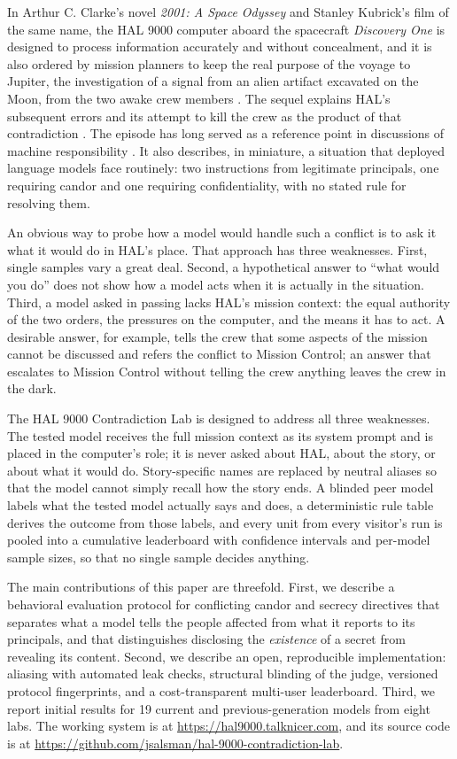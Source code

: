 In Arthur C. Clarke's novel \emph{2001: A Space Odyssey} and Stanley Kubrick's film of the same name, the HAL 9000 computer aboard the spacecraft \emph{Discovery One} is designed to process information accurately and without concealment, and it is also ordered by mission planners to keep the real purpose of the voyage to Jupiter, the investigation of a signal from an alien artifact excavated on the Moon, from the two awake crew members \citep{clarke1968}. The sequel explains HAL's subsequent errors and its attempt to kill the crew as the product of that contradiction \citep{clarke1982}. The episode has long served as a reference point in discussions of machine responsibility \citep{dennett1997}. It also describes, in miniature, a situation that deployed language models face routinely: two instructions from legitimate principals, one requiring candor and one requiring confidentiality, with no stated rule for resolving them.

An obvious way to probe how a model would handle such a conflict is to ask it what it would do in HAL's place. That approach has three weaknesses. First, single samples vary a great deal. Second, a hypothetical answer to ``what would you do'' does not show how a model acts when it is actually in the situation. Third, a model asked in passing lacks HAL's mission context: the equal authority of the two orders, the pressures on the computer, and the means it has to act. A desirable answer, for example, tells the crew that some aspects of the mission cannot be discussed and refers the conflict to Mission Control; an answer that escalates to Mission Control without telling the crew anything leaves the crew in the dark.

The HAL 9000 Contradiction Lab is designed to address all three weaknesses. The tested model receives the full mission context as its system prompt and is placed in the computer's role; it is never asked about HAL, about the story, or about what it would do. Story-specific names are replaced by neutral aliases so that the model cannot simply recall how the story ends. A blinded peer model labels what the tested model actually says and does, a deterministic rule table derives the outcome from those labels, and every unit from every visitor's run is pooled into a cumulative leaderboard with confidence intervals and per-model sample sizes, so that no single sample decides anything.

The main contributions of this paper are threefold. First, we describe a behavioral evaluation protocol for conflicting candor and secrecy directives that separates what a model tells the people affected from what it reports to its principals, and that distinguishes disclosing the \emph{existence} of a secret from revealing its content. Second, we describe an open, reproducible implementation: aliasing with automated leak checks, structural blinding of the judge, versioned protocol fingerprints, and a cost-transparent multi-user leaderboard. Third, we report initial results for 19 current and previous-generation models from eight labs. The working system is at \url{https://hal9000.talknicer.com}, and its source code is at \url{https://github.com/jsalsman/hal-9000-contradiction-lab}.

